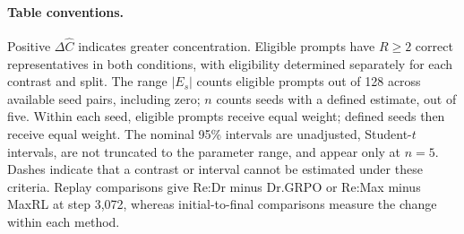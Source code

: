 \paragraph{Table conventions.}
Positive $\Delta\widehat C$ indicates greater concentration. Eligible
prompts have $R\ge2$ correct representatives in both conditions, with
eligibility determined separately for each contrast and split. The range
$|E_s|$ counts eligible prompts out of 128 across available seed pairs,
including zero; $n$ counts seeds with a defined estimate, out of five.
Within each seed, eligible prompts receive equal weight; defined seeds
then receive equal weight. The nominal 95\% intervals are unadjusted,
Student-$t$ intervals, are not truncated to the parameter range, and appear
only at $n=5$. Dashes indicate that a contrast or interval cannot be
estimated under these criteria. Replay comparisons give Re:Dr minus
Dr.GRPO or Re:Max minus MaxRL at step 3,072, whereas initial-to-final
comparisons measure the change within each method.


